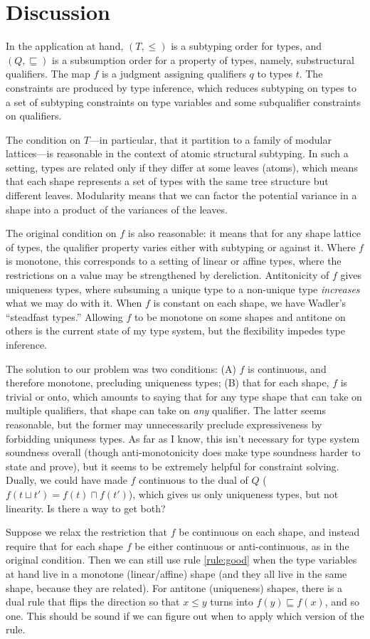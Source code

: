 \documentclass[11pt]{article}
\begin{document}
\section*{Discussion}

In the application at hand,
$(T, ≤)$ is a subtyping order for types, and
$(Q, ⊑)$ is a subsumption order for a property of types, namely,
substructural qualifiers.  The map $f$ is a judgment assigning
qualifiers $q$ to types $t$.  The constraints are produced by type
inference, which reduces subtyping on types to a set of subtyping
constraints on type variables and some subqualifier constraints on
qualifiers.

The condition on $T$---in particular, that it partition to a family of
modular lattices---is reasonable in the context of atomic structural
subtyping.  In such a setting, types are related only if they differ at
some leaves (atoms), which means that each shape represents a set of
types with the same tree structure but different leaves.  Modularity
means that we can factor the potential variance in a shape into a
product of the variances of the leaves.

The original condition on $f$ is also reasonable: it means that for any
shape lattice of types, the qualifier property varies either with
subtyping or against it.  Where $f$ is monotone, this corresponds to a
setting of linear or affine types, where the restrictions on a value may
be strengthened by dereliction.  Antitonicity of $f$ gives uniqueness
types, where subsuming a unique type to a non-unique type
\emph{increases} what we may do with it.  When $f$ is constant on each
shape, we have Wadler's ``steadfast types.'' Allowing $f$ to be monotone
on some shapes and antitone on others is the current state of my type
system, but the flexibility impedes type inference.

The solution to our problem was two conditions: (A) $f$ is continuous,
and therefore monotone, precluding uniqueness types; (B) that for each
shape, $f$ is trivial or onto, which amounts to saying that for any type
shape that can take on multiple qualifiers, that shape can take on
\emph{any} qualifier. The latter seems reasonable, but the former may
unnecessarily preclude expressiveness by forbidding uniquness types.  As
far as I know, this isn't necessary for type system soundness overall
(though anti-monotonicity does make type soundness harder to state and
prove), but it seems to be extremely helpful for constraint solving.
Dually, we could have made $f$ continuous to the dual of $Q$ ($f(t ⊔ t')
= f(t) ⊓ f(t')$), which gives us only uniqueness types, but not
linearity.  Is there a way to get both?

Suppose we relax the restriction that $f$ be continuous on each shape,
and instead require that for each shape $f$ be either continuous or
anti-continuous, as in the original condition.  Then we can still use
rule \eqref{rule:good} when the type variables at hand live in a
monotone (linear/affine) shape (and they all live in the same shape,
because they are related). For antitone (uniqueness) shapes, there is a
dual rule that flips the direction so that $x ≤ y$ turns into $f(y) ⊑
f(x)$, and so one.  This should be sound if we can figure out when to
apply which version of the rule.
\end{document}
